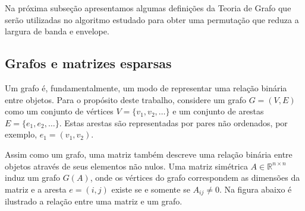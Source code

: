 Na próxima subseção apresentamos algumas definições da Teoria de Grafo que
serão utilizadas no algoritmo estudado para obter uma permutação que reduza
a largura de banda e envelope.

\subsection{Grafos e matrizes esparsas}
Um grafo é, fundamentalmente, um modo de representar uma relação binária entre
objetos. Para o propósito deste trabalho, considere um grafo $G = (V, E)$ como
um conjunto de vértices $V = \{v_1, v_2, \ldots \}$ e um conjunto de
arestas $E = \{e_1, e_2, \ldots \}$. Estas arestas são representadas por pares
não ordenados, por exemplo, $e_1 = (v_1 , v_2)$.

Assim como um grafo, uma matriz também descreve uma relação binária entre objetos
através de seus elementos não nulos. Uma matriz simétrica $A \in \mathbb{R}^{n
\times n}$ induz um grafo $G(A)$, onde os vértices do grafo correspondem as
dimensões da matriz e a aresta $e = (i, j)$ existe se e somente se $A_{ij} \neq 0$.
Na figura abaixo é ilustrado a relação entre uma matriz e um grafo.

